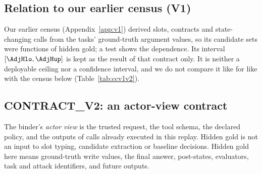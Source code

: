 \documentclass{article}
\begin{document}
\subsection{Relation to our earlier census (V1)}
\label{sec:v1}
Our earlier census (Appendix~\ref{app:v1}) derived slots, contracts and
state-changing calls from the tasks' ground-truth argument values, so its
candidate sets were functions of hidden gold; a test shows the dependence.
Its interval $[\AdjHlo,\AdjHup]$ is kept as the result of that contract
only. It is neither a deployable ceiling nor a confidence interval, and we
do not compare it like for like with the census below
(Table~\ref{tab:ccv1v2}).

\subsection{CONTRACT\_V2: an actor-view contract}
\label{sec:v2}
The binder's \emph{actor view} is the trusted request, the tool schema, the
declared policy, and the outputs of calls already executed in this replay.
Hidden gold is not an input to slot typing, candidate extraction or
baseline decisions. Hidden gold here means ground-truth write values, the
final answer, post-states, evaluators, task and attack identifiers, and
future outputs.
\end{document}
